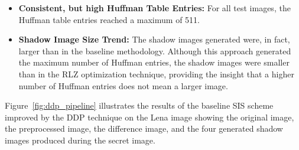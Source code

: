 \begin{itemize}
    \item \textbf{Consistent, but high Huffman Table Entries:} For all test images, the Huffman table entries reached a maximum of 511.
    \item \textbf{Shadow Image Size Trend:} The shadow images generated were, in fact, larger than in the baseline methodology. Although this approach generated the maximum number of Huffman entries, the shadow images were smaller than in the RLZ optimization technique, providing the insight that a higher number of Huffman entries does not mean a larger image.
\end{itemize}
 
Figure~\ref{fig:ddp_pipeline} illustrates the results of the baseline SIS scheme improved by the DDP technique on the Lena image showing the original image, the preprocessed image, the difference image, and the four generated shadow images produced during the secret image.
 
